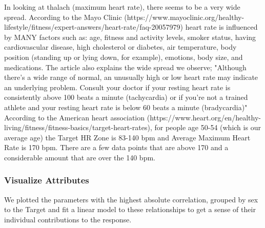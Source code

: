 \documentclass[11pt]{article}
\begin{document}
In looking at thalach (maximum heart rate), there seems to be a very
wide spread. According to the Mayo Clinic
(https://www.mayoclinic.org/healthy-lifestyle/fitness/expert-answers/heart-rate/faq-20057979)
heart rate is influenced by MANY factors such as: age, fitness and
activity levels, smoker status, having cardiovascular disease, high
cholesterol or diabetes, air temperature, body position (standing up or
lying down, for example), emotions, body size, and medications. The
article also explains the wide spread we observe; "Although there's a
wide range of normal, an unusually high or low heart rate may indicate
an underlying problem. Consult your doctor if your resting heart rate is
consistently above 100 beats a minute (tachycardia) or if you're not a
trained athlete and your resting heart rate is below 60 beats a minute
(bradycardia)" According to the American heart association
(https://www.heart.org/en/healthy-living/fitness/fitness-basics/target-heart-rates),
for people age 50-54 (which is our average age) the Target HR Zone is
83-140 bpm and Average Maximum Heart Rate is 170 bpm. There are a few
data points that are above 170 and a considerable amount that are over
the 140 bpm.

    \subsubsection{Visualize Attributes}\label{visualize-attributes}

    We plotted the parameters with the highest absolute correlation, grouped
by sex to the Target and fit a linear model to these relationships to
get a sense of their individual contributions to the response.
\end{document}
